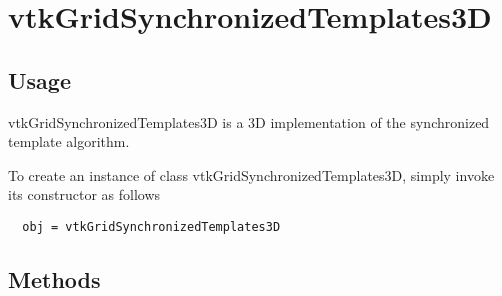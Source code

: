 \section{vtkGridSynchronizedTemplates3D}

\subsection{Usage}

 vtkGridSynchronizedTemplates3D is a 3D implementation of the synchronized 
 template algorithm.

To create an instance of class vtkGridSynchronizedTemplates3D, simply
invoke its constructor as follows
\begin{verbatim}
  obj = vtkGridSynchronizedTemplates3D
\end{verbatim}
\subsection{Methods}

